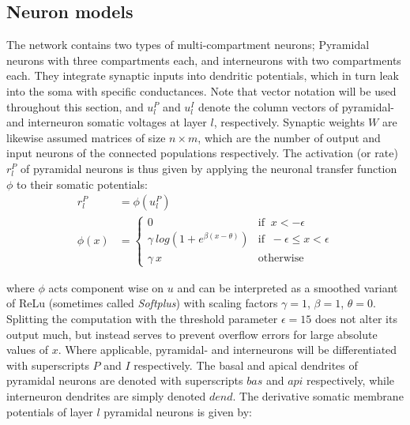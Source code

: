 \subsection{Neuron models}\label{sec-neurons}



The network contains two types of multi-compartment neurons; Pyramidal neurons with three compartments each, and
interneurons with two compartments each. They integrate synaptic inputs into dendritic potentials, which in turn leak
into the soma with specific conductances. Note that vector notation will be used throughout this section, and $u_l^P$
and $u_l^I$ denote the column vectors of pyramidal- and interneuron somatic voltages at layer $l$, respectively.
Synaptic weights $W$ are likewise assumed matrices of size $n \times m$, which are the number of output and input
neurons of the connected populations respectively. The activation (or rate) $r_l^P$ of pyramidal neurons is thus given
by applying the neuronal transfer function $\phi$ to their somatic potentials:
\begin{align}
  r_l^P   & = \phi(u_l^P)                                                                      \\
  \phi(x) & = \begin{cases}
                0                                   & \textrm{if } \ x < -\epsilon               \\
                \gamma \ log(1+e^{\beta(x-\theta)}) & \textrm{if } \ -\epsilon \leq x < \epsilon \\
                \gamma \ x                          & \textrm{otherwise}
              \end{cases}
\end{align}

where $\phi$ acts component wise on $u$ and can be interpreted as a smoothed variant of ReLu (sometimes called
\textit{Softplus}) with scaling factors $\gamma=1$, $\beta=1$, $\theta=0$. Splitting the computation with the threshold
parameter $\epsilon=15$ does not alter its output much, but instead serves to prevent overflow errors for large absolute
values of $x$.  Where applicable, pyramidal- and interneurons will be differentiated with superscripts $P$ and $I$
respectively. The basal and apical dendrites of pyramidal neurons are denoted with superscripts $bas$ and $api$
respectively, while interneuron dendrites are simply denoted $dend$.  The derivative somatic membrane potentials of
layer $l$ pyramidal neurons is given by:

